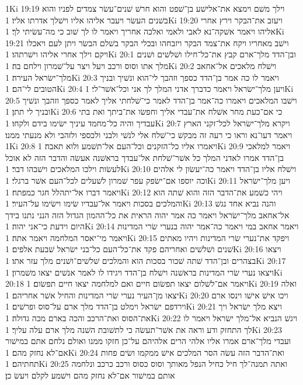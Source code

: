 1Ki 19:19  וילך משׁם וימצא את־אלישׁע בן־שׁפט והוא חרשׁ שׁנים־עשׂר צמדים לפניו והוא בשׁנים העשׂר ויעבר אליהו אליו וישׁלך אדרתו אליו׃
1Ki 19:20  ויעזב את־הבקר וירץ אחרי אליהו ויאמר אשׁקה־נא לאבי ולאמי ואלכה אחריך ויאמר לו לך שׁוב כי מה־עשׂיתי לך׃
1Ki 19:21  וישׁב מאחריו ויקח את־צמד הבקר ויזבחהו ובכלי הבקר בשׁלם הבשׂר ויתן לעם ויאכלו ויקם וילך אחרי אליהו וישׁרתהו׃
1Ki 20:1  ובן־הדד מלך־ארם קבץ את־כל־חילו ושׁלשׁים ושׁנים מלך אתו וסוס ורכב ויעל ויצר על־שׁמרון וילחם בה׃
1Ki 20:2  וישׁלח מלאכים אל־אחאב מלך־ישׂראל העירה׃
1Ki 20:3  ויאמר לו כה אמר בן־הדד כספך וזהבך לי־הוא ונשׁיך ובניך הטובים לי־הם׃
1Ki 20:4  ויען מלך־ישׂראל ויאמר כדברך אדני המלך לך אני וכל־אשׁר־לי׃
1Ki 20:5  וישׁבו המלאכים ויאמרו כה־אמר בן־הדד לאמר כי־שׁלחתי אליך לאמר כספך וזהבך ונשׁיך ובניך לי תתן׃
1Ki 20:6  כי אם־כעת מחר אשׁלח את־עבדי אליך וחפשׂו את־ביתך ואת בתי עבדיך והיה כל־מחמד עיניך ישׂימו בידם ולקחו׃
1Ki 20:7  ויקרא מלך־ישׂראל לכל־זקני הארץ ויאמר דעו־נא וראו כי רעה זה מבקשׁ כי־שׁלח אלי לנשׁי ולבני ולכספי ולזהבי ולא מנעתי ממנו׃
1Ki 20:8  ויאמרו אליו כל־הזקנים וכל־העם אל־תשׁמע ולוא תאבה׃
1Ki 20:9  ויאמר למלאכי בן־הדד אמרו לאדני המלך כל אשׁר־שׁלחת אל־עבדך בראשׁנה אעשׂה והדבר הזה לא אוכל לעשׂות וילכו המלאכים וישׁבהו דבר׃
1Ki 20:10  וישׁלח אליו בן־הדד ויאמר כה־יעשׂון לי אלהים וכה יוספו אם־ישׂפק עפר שׁמרון לשׁעלים לכל־העם אשׁר ברגלי׃
1Ki 20:11  ויען מלך־ישׂראל ויאמר דברו אל־יתהלל חגר כמפתח׃
1Ki 20:12  ויהי כשׁמע את־הדבר הזה והוא שׁתה הוא והמלכים בסכות ויאמר אל־עבדיו שׂימו וישׂימו על־העיר׃
1Ki 20:13  והנה נביא אחד נגשׁ אל־אחאב מלך־ישׂראל ויאמר כה אמר יהוה הראית את כל־ההמון הגדול הזה הנני נתנו בידך היום וידעת כי־אני יהוה׃
1Ki 20:14  ויאמר אחאב במי ויאמר כה־אמר יהוה בנערי שׂרי המדינות ויאמר מי־יאסר המלחמה ויאמר אתה׃
1Ki 20:15  ויפקד את־נערי שׂרי המדינות ויהיו מאתים שׁנים ושׁלשׁים ואחריהם פקד את־כל־העם כל־בני ישׂראל שׁבעת אלפים׃
1Ki 20:16  ויצאו בצהרים ובן־הדד שׁתה שׁכור בסכות הוא והמלכים שׁלשׁים־ושׁנים מלך עזר אתו׃
1Ki 20:17  ויצאו נערי שׂרי המדינות בראשׁנה וישׁלח בן־הדד ויגידו לו לאמר אנשׁים יצאו משׁמרון׃
1Ki 20:18  ויאמר אם־לשׁלום יצאו תפשׂום חיים ואם למלחמה יצאו חיים תפשׂום׃
1Ki 20:19  ואלה יצאו מן־העיר נערי שׂרי המדינות והחיל אשׁר אחריהם׃
1Ki 20:20  ויכו אישׁ אישׁו וינסו ארם וירדפם ישׂראל וימלט בן־הדד מלך ארם על־סוס ופרשׁים׃
1Ki 20:21  ויצא מלך ישׂראל ויך את־הסוס ואת־הרכב והכה בארם מכה גדולה׃
1Ki 20:22  ויגשׁ הנביא אל־מלך ישׂראל ויאמר לו לך התחזק ודע וראה את אשׁר־תעשׂה כי לתשׁובת השׁנה מלך ארם עלה עליך׃
1Ki 20:23  ועבדי מלך־ארם אמרו אליו אלהי הרים אלהיהם על־כן חזקו ממנו ואולם נלחם אתם במישׁור אם־לא נחזק מהם׃
1Ki 20:24  ואת־הדבר הזה עשׂה הסר המלכים אישׁ ממקמו ושׂים פחות תחתיהם׃
1Ki 20:25  ואתה תמנה־לך חיל כחיל הנפל מאותך וסוס כסוס ורכב כרכב ונלחמה אותם במישׁור אם־לא נחזק מהם וישׁמע לקלם ויעשׂ כן׃
